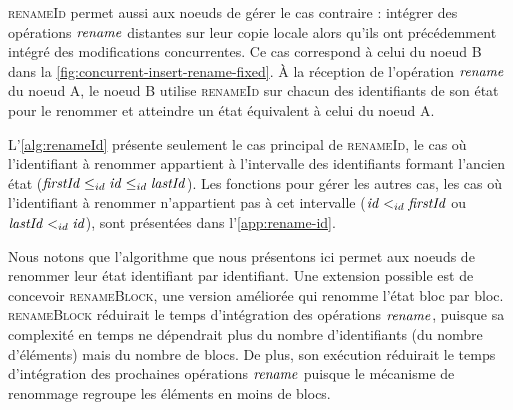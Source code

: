 \textsc{renameId} permet aussi aux noeuds de gérer le cas contraire : intégrer des opérations $\mathit{rename}$ distantes sur leur copie locale alors qu'ils ont précédemment intégré des modifications concurrentes.
Ce cas correspond à celui du noeud B dans la \autoref{fig:concurrent-insert-rename-fixed}.
À la réception de l'opération $\mathit{rename}$ du noeud A, le noeud B utilise \textsc{renameId} sur chacun des identifiants de son état pour le renommer et atteindre un état équivalent à celui du noeud A.

L'\autoref{alg:renameId} présente seulement le cas principal de \textsc{renameId}, \ie le cas où l'identifiant à renommer appartient à l'intervalle des identifiants formant l'ancien état ($\mathit{firstId} \leq_{id} \mathit{id} \leq_{id} \mathit{lastId}$).
Les fonctions pour gérer les autres cas, \ie les cas où l'identifiant à renommer n'appartient pas à cet intervalle ($\mathit{id} <_{id} \mathit{firstId}$ ou $\mathit{lastId} <_{id} \mathit{id}$), sont présentées dans l'\autoref{app:rename-id}.

Nous notons que l'algorithme que nous présentons ici permet aux noeuds de renommer leur état identifiant par identifiant.
Une extension possible est de concevoir \textsc{renameBlock}, une version améliorée qui renomme l'état bloc par bloc.
\textsc{renameBlock} réduirait le temps d'intégration des opérations $\mathit{rename}$, puisque sa complexité en temps ne dépendrait plus du nombre d'identifiants (\ie du nombre d'éléments) mais du nombre de blocs.
De plus, son exécution réduirait le temps d'intégration des prochaines opérations $\mathit{rename}$ puisque le mécanisme de renommage regroupe les éléments en moins de blocs.
